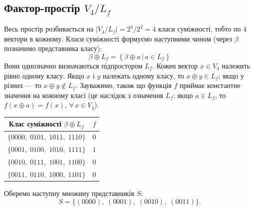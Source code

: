 \subsection{Фактор-простір \texorpdfstring{$V_{4} / L_{f}$}{V4}}
Весь простір розбивається на $|V_{4} / L_{f}| = 2^4 / 2^2 = 4$ класи суміжності, тобто по $4$ вектори в кожному. 
Класи суміжності формуємо наступними чином (через $\beta$ позначимо представника класу):
\begin{equation*}
    \beta \oplus L_{f} = \left\{\beta \oplus a \, \vert \, a \in L_{f}\right\}
\end{equation*}
Вони однозначно визначаються підпростором $L_f$. Кожен вектор $x \in V_4$ належить рівно одному класу. Якщо 
$x$ і $y$ належать одному класу, то $x \oplus y \in L_f$; якщо у різних — то $x \oplus y \notin L_f$. Зауважимо, 
також що функція $f$ приймає константне значення на кожному класі (це наслідок з означення $L_{f}$: якщо 
$a \in L_{f}$, то $f(x \oplus a) = f(x), \, \forall \, x \in V_{4}$).
\begin{center}
    \renewcommand{\arraystretch}{1.3}
    \begin{tabular}{c|c}
        \textbf{Клас суміжності} $\beta \oplus L_{f}$ & $f$ \\
        \hline
        $\{0000,\; 0101,\; 1011,\; 1110\}$            & $0$ \\
        $\{0001,\; 0100,\; 1010,\; 1111\}$            & $1$ \\
        $\{0010,\; 0111,\; 1001,\; 1100\}$            & $0$ \\
        $\{0011,\; 0110,\; 1000,\; 1101\}$            & $0$ \\
    \end{tabular}
\end{center}
Оберемо наступну множину представників $S$:
\begin{equation*}
    S = \{(0000),\; (0001),\; (0010),\; (0011)\}.
\end{equation*}


